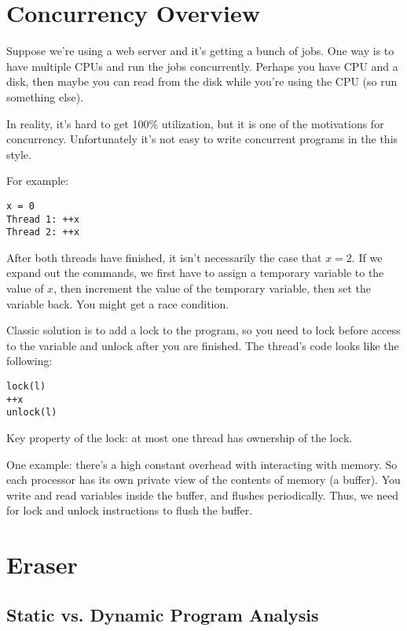 \documentclass[psamsfonts]{amsart}
\begin{document}
\maketitle

\section{Concurrency Overview}

Suppose we're using a web server and it's getting a bunch of jobs. One way is to have multiple CPUs and run the jobs concurrently. Perhaps you have CPU and a disk, then maybe you can read from the disk while you're using the CPU (so run something else).

In reality, it's hard to get 100\% utilization, but it is one of the motivations for concurrency. Unfortunately it's not easy to write concurrent programs in the this style.

For example:
\begin{verbatim}
x = 0
Thread 1: ++x
Thread 2: ++x
\end{verbatim}

After both threads have finished, it isn't necessarily the case that $x = 2$. If we expand out the commands, we first have to assign a temporary variable to the value of $x$, then increment the value of the temporary variable, then set the variable back. You might get a race condition.

Classic solution is to add a lock to the program, so you need to lock before access to the variable and unlock after you are finished. The thread's code looks like the following:
\begin{verbatim}
lock(l)
++x
unlock(l)
\end{verbatim}

Key property of the lock: at most one thread has ownership of the lock.

One example: there's a high constant overhead with interacting with memory. So each processor has its own private view of the contents of memory (a buffer). You write and read variables inside the buffer, and flushes periodically. Thus, we need for lock and unlock instructions to flush the buffer.

\section{Eraser}

\subsection{Static vs. Dynamic Program Analysis}
\end{document}
